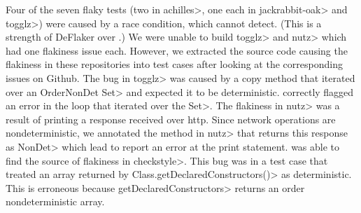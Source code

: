 Four of the seven flaky tests (two in \<achilles>, one each in \<jackrabbit-oak> and \<togglz>)
were caused by a race condition, which \theDeterminismChecker
cannot detect.  (This is a strength of DeFlaker over \theDeterminismChecker.)
We were unable to build \<togglz> and \<nutz> which had one flakiness issue each.
However, we extracted the source code causing the flakiness in these repositories into test cases
after looking at the corresponding issues on Github. The bug in \<togglz> was caused by a copy method that iterated over
an \<OrderNonDet Set> and expected it to be deterministic. \TheDeterminismChecker correctly flagged
an error in the loop that iterated over the \<Set>.
The flakiness in \<nutz> was a result of printing a response received over http.
Since network operations are nondeterministic, we annotated the method in \<nutz> that
returns this response as \<NonDet> which lead \TheDeterminismChecker to report an error at the print statement. 
\TheDeterminismChecker was able to find the source of flakiness in \<checkstyle>. This bug was in a test
case that treated an array returned by \<Class.getDeclaredConstructors()>
as deterministic. This is erroneous because \<getDeclaredConstructors> returns an order nondeterministic array.
